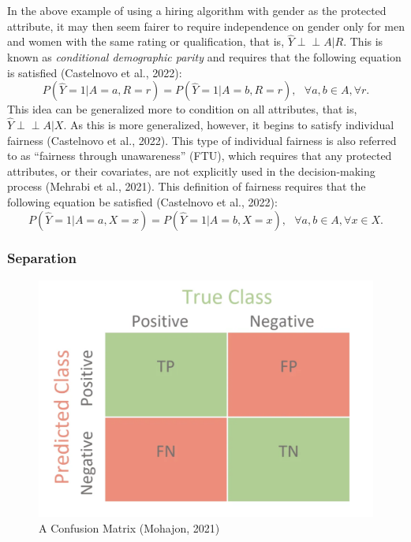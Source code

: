 \documentclass[12pt, twoside]{amherstthesis}
\begin{document}
In the above example of using a hiring algorithm with gender as the protected attribute, it may then seem fairer to require independence on gender only for men and women with the same rating or qualification, that is, \(\hat{Y} \perp \!\!\! \perp A | R\). This is known as \emph{conditional demographic parity} and requires that the following equation is satisfied (Castelnovo et al., 2022):
\begin{equation}
\label{ch1eq4}
P (\hat{Y} = 1 | A = a, R = r) = P (\hat{Y} = 1 | A = b, R = r), \text{    } \forall a, b \in A, \forall r.
\end{equation}
This idea can be generalized more to condition on all attributes, that is, \(\hat{Y} \perp \!\!\! \perp A | X\). As this is more generalized, however, it begins to satisfy individual fairness (Castelnovo et al., 2022). This type of individual fairness is also referred to as ``fairness through unawareness'' (FTU), which requires that any protected attributes, or their covariates, are not explicitly used in the decision-making process (Mehrabi et al., 2021). This definition of fairness requires that the following equation be satisfied (Castelnovo et al., 2022):
\begin{equation}
\label{ch1eq5}
P (\hat{Y} = 1 | A = a, X = x) = P (\hat{Y} = 1 | A = b, X = x), \text{ } \forall a, b \in A, \forall x \in X.
\end{equation}
\hypertarget{separation}{%
\subsubsection{Separation}\label{separation}}
\begin{figure}

{\centering \includegraphics[width=0.75\linewidth]{figures/confusionmatrix} 

}

\caption[A Confusion Matrix]{A Confusion Matrix (Mohajon, 2021)}\label{fig:confusionmatrix}
\end{figure}
\end{document}
